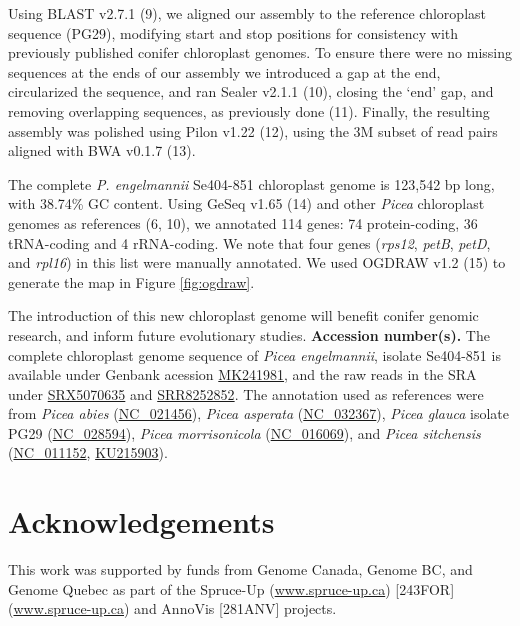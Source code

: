 \documentclass[titlepage,11pt, oneside]{article}   	%
\begin{document}
\newline
\par
Using BLAST v2.7.1 (9), we aligned our assembly to the reference chloroplast sequence (PG29), modifying start and stop positions for consistency with previously published conifer chloroplast genomes. To ensure there were no missing sequences at the ends of our assembly we introduced a gap at the end, circularized the sequence, and ran Sealer v2.1.1 (10), closing the ‘end’ gap, and removing overlapping sequences, as previously done (11). Finally, the resulting assembly was polished using Pilon v1.22 (12), using the 3M subset of read pairs aligned with BWA v0.1.7 (13).
\newline
\par
The complete \textit{P. engelmannii} Se404-851 chloroplast genome is 123,542 bp long, with 38.74\% GC content. Using GeSeq v1.65 (14) and other \textit{Picea} chloroplast genomes as references (6, 10), we annotated 114 genes: 74 protein-coding, 36 tRNA-coding and 4 rRNA-coding. We note that four genes (\textit{rps12}, \textit{petB}, \textit{petD}, and \textit{rpl16}) in this list were manually annotated. We used OGDRAW v1.2 (15) to generate the map in Figure \ref{fig:ogdraw}.
\newline
\par
The introduction of this new chloroplast genome will benefit conifer genomic research, and inform future evolutionary studies.
\newline
\newline
\textbf{Accession number(s).} The complete chloroplast genome sequence of \textit{Picea engelmannii}, isolate Se404-851 is available under Genbank acession \href{https://www.ncbi.nlm.nih.gov/nuccore/MK241981}{MK241981}, and the raw reads in the SRA under \href{https://www.ncbi.nlm.nih.gov/sra/SRX5070635}{SRX5070635} and \href{https://trace.ncbi.nlm.nih.gov/Traces/sra/?run=SRR8252852}{SRR8252852}. The annotation used as references were from \textit{Picea abies} (\href{https://www.ncbi.nlm.nih.gov/nuccore/NC_021456}{NC\_021456}), \textit{Picea asperata} (\href{https://www.ncbi.nlm.nih.gov/nuccore/NC_032367}{NC\_032367}), \textit{Picea glauca} isolate PG29 (\href{https://www.ncbi.nlm.nih.gov/nuccore/NC_028594}{NC\_028594}), \textit{Picea morrisonicola} (\href{https://www.ncbi.nlm.nih.gov/nuccore/NC_016069}{NC\_016069}), and \textit{Picea sitchensis} (\href{https://www.ncbi.nlm.nih.gov/nuccore/NC_011152}{NC\_011152}, \href{https://www.ncbi.nlm.nih.gov/nuccore/KU215903}{KU215903}).

\section*{Acknowledgements}
This work was supported by funds from Genome Canada, Genome BC, and Genome Quebec as part of the Spruce-Up (\url{www.spruce-up.ca}) [243FOR] (\url{www.spruce-up.ca}) and AnnoVis [281ANV] projects.
\end{document}
